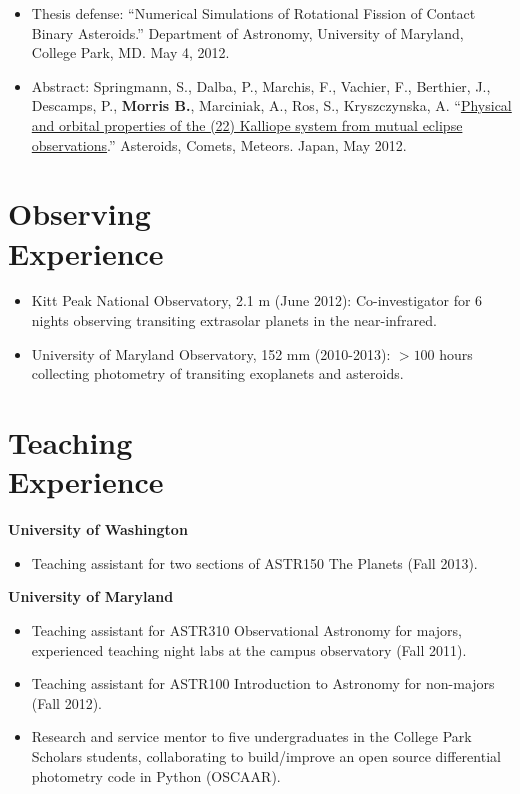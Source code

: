 \documentclass[margin]{res}
\begin{document}
\begin{resume}
\begin{itemize}
	        \item Thesis defense:  ``Numerical Simulations of Rotational Fission of Contact Binary Asteroids.'' Department of Astronomy, University of Maryland, College Park, MD. May 4, 2012.
                 \item Abstract: Springmann, S., Dalba, P., Marchis, F., Vachier, F., Berthier, J., Descamps, P., \textbf{Morris B.}, 
		Marciniak, A., Ros, S., Kryszczynska, A. ``\href{http://adsabs.harvard.edu/abs/2012LPICo1667.6352S}{Physical and orbital properties of the (22) Kalliope system from mutual eclipse observations}.'' 
		Asteroids, Comets, Meteors. Japan, May 2012.\\
		\end{itemize}

\section{Observing \\Experience}
            \begin{itemize}   
            \item Kitt Peak National Observatory, 2.1 m (June 2012): Co-investigator for 6 nights observing transiting extrasolar planets in the near-infrared.
            \item University of Maryland Observatory, 152 mm (2010-2013): $>100$ hours collecting photometry of transiting exoplanets and asteroids. \\
            \end{itemize}
                 
\section{Teaching \\Experience}
	     \textbf{University of Washington}
            \begin{itemize}   
            \item Teaching assistant for two sections of ASTR150 The Planets (Fall 2013). 
            \end{itemize}
	     \textbf{University of Maryland}
            \begin{itemize}   
            \item Teaching assistant for ASTR310 Observational Astronomy for majors, experienced teaching night labs at the campus observatory (Fall 2011).
            \item Teaching assistant for ASTR100 Introduction to Astronomy for non-majors (Fall 2012).
            \item Research and service mentor to five undergraduates in the College Park Scholars students, collaborating to build/improve an open source differential photometry code in Python (OSCAAR). \\
            \end{itemize}
            

\end{resume}
\end{document}
